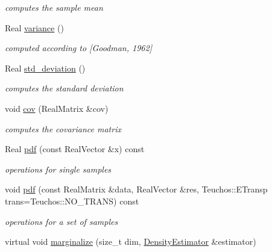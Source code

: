\begin{DoxyCompactItemize}
\begin{DoxyCompactList}\small\item\em computes the sample mean \end{DoxyCompactList}\item 
Real \hyperlink{classPecos_1_1GaussianKDE_a38f6da77468be17e02ce38af2c0976c3}{variance} ()\label{classPecos_1_1GaussianKDE_a38f6da77468be17e02ce38af2c0976c3}

\begin{DoxyCompactList}\small\item\em computed according to \mbox{[}Goodman, 1962\mbox{]} \end{DoxyCompactList}\item 
Real \hyperlink{classPecos_1_1GaussianKDE_a3e3c923ec6be63011f72bb65b08789ed}{std\+\_\+deviation} ()\label{classPecos_1_1GaussianKDE_a3e3c923ec6be63011f72bb65b08789ed}

\begin{DoxyCompactList}\small\item\em computes the standard deviation \end{DoxyCompactList}\item 
void \hyperlink{classPecos_1_1GaussianKDE_a8cf84ab65e0bccb16f5cdbccc9790dc9}{cov} (Real\+Matrix \&cov)\label{classPecos_1_1GaussianKDE_a8cf84ab65e0bccb16f5cdbccc9790dc9}

\begin{DoxyCompactList}\small\item\em computes the covariance matrix \end{DoxyCompactList}\item 
Real \hyperlink{classPecos_1_1GaussianKDE_ae49fd0166d0cedd899f933e3e2b713aa}{pdf} (const Real\+Vector \&x) const \label{classPecos_1_1GaussianKDE_ae49fd0166d0cedd899f933e3e2b713aa}

\begin{DoxyCompactList}\small\item\em operations for single samples \end{DoxyCompactList}\item 
void \hyperlink{classPecos_1_1GaussianKDE_a83ef7a2b0cf786922fbdfb17d284d2e0}{pdf} (const Real\+Matrix \&data, Real\+Vector \&res, Teuchos\+::\+E\+Transp trans=Teuchos\+::\+N\+O\+\_\+\+T\+R\+A\+NS) const \label{classPecos_1_1GaussianKDE_a83ef7a2b0cf786922fbdfb17d284d2e0}

\begin{DoxyCompactList}\small\item\em operations for a set of samples \end{DoxyCompactList}\item 
virtual void \hyperlink{classPecos_1_1GaussianKDE_a5aa525959e7bee8034a26a77e00f12ef}{marginalize} (size\+\_\+t dim, \hyperlink{classPecos_1_1DensityEstimator}{Density\+Estimator} \&estimator)\label{classPecos_1_1GaussianKDE_a5aa525959e7bee8034a26a77e00f12ef}


\end{DoxyCompactItemize}
